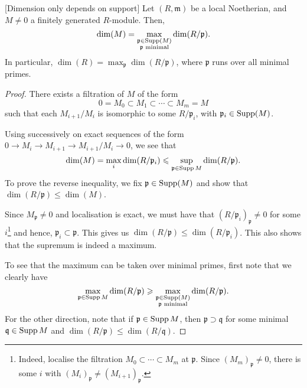 \documentclass[12pt]{article}
\begin{document}
\begin{thm} \label{thm:dimension-depends-support}[Dimension only depends on support]
	Let $(R, \mathfrak{m})$ be a local Noetherian, and $M \neq 0$ a finitely generated $R$-module. Then,
	\begin{equation*} 
		\dim(M) = \max_{\substack{\mathfrak{p} \in \operatorname{Supp}(M) \\ \mathfrak{p} \text{ minimal}}} \dim(R/\mathfrak{p}).
	\end{equation*}
	In particular, $\dim(R) = \max_{\mathfrak{p}} \dim(R/\mathfrak{p})$, where $\mathfrak{p}$ runs over all minimal primes.
\end{thm}
\begin{proof} 
	There exists a filtration of $M$ of the form
	\begin{equation*} 
		0 = M_{0} \subset M_{1} \subset \cdots \subset M_{m} = M
	\end{equation*}
	such that each $M_{i + 1}/M_{i}$ is isomorphic to some $R/\mathfrak{p}_{i}$, with $\mathfrak{p}_{i} \in \operatorname{Supp}(M)$. 

	Using  successively on exact sequences of the form $0 \to M_{i} \to M_{i + 1} \to M_{i + 1}/M_{i} \to 0$, we see that
	\begin{equation*} 
		\dim(M) = \max_{i} \dim(R/\mathfrak{p}_{i}) \leqslant \sup_{\mathfrak{p} \in \operatorname{Supp} M} \dim(R/\mathfrak{p}).
	\end{equation*}
	To prove the reverse inequality, we fix $\mathfrak{p} \in \operatorname{Supp}(M)$ and show that $\dim(R/\mathfrak{p}) \le \dim(M)$.

	Since $M_{\mathfrak{p}} \neq 0$ and localisation is exact, we must have that $(R/\mathfrak{p}_{i})_{\mathfrak{p}} \neq 0$ for some $i$\footnote{Indeed, localise the filtration $M_{0} \subset \cdots \subset M_{m}$ at $\mathfrak{p}$. Since $(M_{m})_{\mathfrak{p}} \neq 0$, there is some $i$ with $(M_{i})_{\mathfrak{p}} \neq (M_{i + 1})_{\mathfrak{p}}$.} and hence, $\mathfrak{p}_{i} \subset \mathfrak{p}$. This gives us $\dim(R/\mathfrak{p}) \le \dim(R/\mathfrak{p}_{i})$. \newline
	This also shows that the supremum is indeed a maximum.

	To see that the maximum can be taken over minimal primes, first note that we clearly have
	\begin{equation*} 
		\max_{\mathfrak{p} \in \operatorname{Supp} M} \dim(R/\mathfrak{p}) \geqslant \max_{\substack{\mathfrak{p} \in \operatorname{Supp}(M) \\ \mathfrak{p} \text{ minimal}}} \dim(R/\mathfrak{p}).
	\end{equation*}
	For the other direction, note that if $\mathfrak{p} \in \operatorname{Supp} M$, then $\mathfrak{p} \supset \mathfrak{q}$ for some minimal $\mathfrak{q} \in \operatorname{Supp} M$ and $\dim(R/\mathfrak{p}) \le \dim(R/\mathfrak{q})$.
\end{proof}
\end{document}
